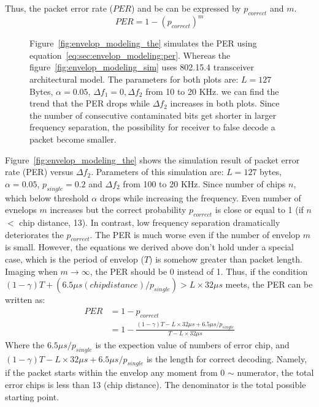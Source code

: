 Thus, the packet error rate ($PER$) and be can be expressed by $p_{correct}$ and $m$.
\begin{equation}
	PER = 1 - (p_{correct})^m
	\label{eq:sec:envelop_modeling:per}
\end{equation}

\begin{figure*}
\centering
	\centering
	\caption{Figure~\ref{fig:envelop_modeling_the} simulates the PER using equation~\ref{eq:sec:envelop_modeling:per}.
	Whereas the figure~\ref{fig:envelop_modeling_sim} uses 802.15.4 transceiver architectural model. The parameters
	for both plots are: $L = 127$ Bytes, $\alpha = 0.05$, $\Delta f_1 = 0, \Delta f_2$ from 10 to 20 KHz. we can
	find the trend that the PER drops while $\Delta f_2$ increases in both plots. Since the number of consecutive 
	contaminated bits get shorter in larger frequency separation, the possibility for receiver to false decode a
	packet become smaller.}
	\label{fig:envelop_modeling}
\end{figure*}

Figure~\ref{fig:envelop_modeling_the} shows the simulation result of packet error rate (PER) versus
$\Delta f_2$. Parameters of this simulation are: $L = 127$ bytes, $\alpha = 0.05$, $p_{single} = 0.2$
and $\Delta f_2$ from 100 to 20 KHz. Since number of chips $n$, which below threshold $\alpha$ drops
while increasing the frequency. Even number of evnelops $m$ increases but the correct probability 
$p_{correct}$ is close or equal to 1 (if $n$ $<$ chip distance, 13). In contrast, low frequency separation
dramatically deteriorates the $p_{correct}$. The PER is much worse even if the number of envelop $m$ is small.
However, the equations we derived above don't hold under a special case, which is the period of envelop ($T$)
is somehow greater than packet length. Imaging when $m \to \infty$, the PER should be 0 instead of 1. Thus, if the
condition $(1-\gamma)T + (6.5 \mu s(chip distance)/p_{single}) > L\times32 \mu s$ meets, the PER can be written as:
\begin{align}
	PER &= 1 - p_{correct} \\
		&= 1 - \tfrac{(1-\gamma)T - L\times32\mu s + 6.5\mu s/p_{single}}{T - L\times32 \mu s}
\end{align}
Where the $6.5 \mu s/p_{single}$ is the expection value of numbers of error chip, and 
$(1-\gamma)T - L\times32 \mu s + 6.5 \mu s/p_{single}$ is the length for correct decoding. Namely,
if the packet starts within the envelop any moment from 0 $\sim$ numerator, the total error chips is less
than 13 (chip distance). The denominator is the total possible starting point.



